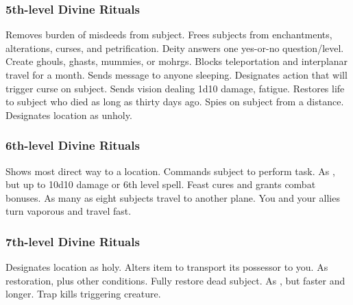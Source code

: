 \subsubsection{5th-level Divine Rituals}
\begin{rituallist}
    \F\M Removes burden of misdeeds from subject.
     Frees subjects from enchantments, alterations, curses, and petrification.
     Deity answers one yes-or-no question/level.
     Create ghouls, ghasts, mummies, or mohrgs.
     Blocks teleportation and interplanar travel for a month.
     Sends message to anyone sleeping.
     Designates action that will trigger curse on subject.
     Sends vision dealing 1d10 damage, fatigue.
     Restores life to subject who died as long as thirty days ago.
    \F Spies on subject from a distance.
     Designates location as unholy.
\end{rituallist}

\subsubsection{6th-level Divine Rituals}
\begin{rituallist}
     Shows most direct way to a location.
     Commands subject to perform task.
     As , but up to 10d10 damage or 6th level spell.
     Feast cures and grants combat bonuses.
    \F As many as eight subjects travel to another plane.
     You and your allies turn vaporous and travel fast.
\end{rituallist}

\subsubsection{7th-level Divine Rituals}
\begin{rituallist}
     Designates location as holy.
     Alters item to transport its possessor to you.
     As restoration, plus other conditions.
     Fully restore dead subject.
     As , but faster and longer.
     Trap kills triggering creature.
\end{rituallist}

